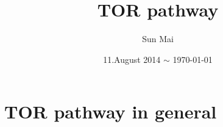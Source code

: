 \documentclass[a4paper, 11pt]{article}
\begin{document}
\title{TOR pathway}
\author{Sun Mai}
\date{11.August 2014 $\sim$ \today}
\maketitle

\pagestyle{fancy}
\fancyhead{}
\fancyhead[R]{\slshape \leftmark}
\fancyfoot[C]{\thepage}

\newpage
\tableofcontents

\newpage
\sloppy
\section{TOR pathway in general}
	\subsection{}
		\paragraph{}
\section{}


\renewcommand{\bibname}{References} %
\end{document}
